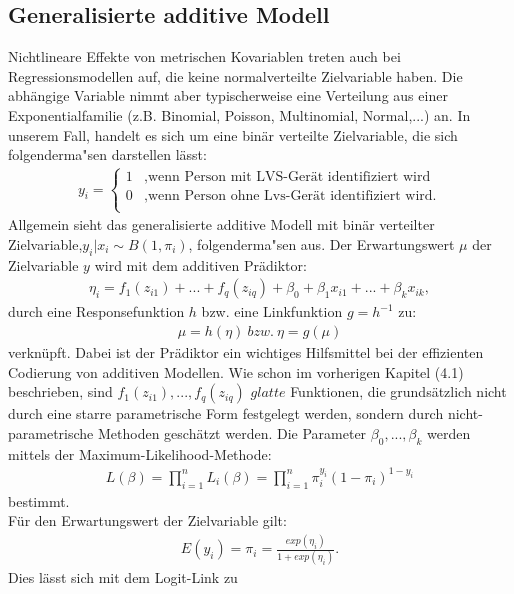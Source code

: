 \documentclass[12pt]{scrreprt}
\begin{document}
\subsection{Generalisierte additive Modell}
Nichtlineare Effekte von metrischen Kovariablen treten auch bei Regressionsmodellen auf, die keine normalverteilte Zielvariable haben. Die abhängige Variable nimmt aber typischerweise eine Verteilung aus einer Exponentialfamilie (z.B. Binomial, Poisson, Multinomial, Normal,...) an.  In unserem Fall, handelt es sich um eine binär verteilte Zielvariable, die sich folgenderma"sen darstellen lässt:
\begin{align}
y_{i}=\begin{cases}
1 & \text{,wenn Person mit LVS-Gerät identifiziert wird } \\
0 & \text{,wenn Person ohne Lvs-Gerät identifiziert wird.} \\
\end{cases}
\end{align}
Allgemein sieht das generalisierte additive Modell mit binär verteilter Zielvariable,\enspace $y_{i}|x_{i}\sim B(1,\pi_{i})$, folgenderma"sen aus.
Der Erwartungswert $\mu$ der Zielvariable $y$ wird mit dem additiven Prädiktor:
\begin{align}
\eta_{i}= f_{1}(z_{i1})+...+f_{q}(z_{iq})+\beta_{0}+\beta_{1}x_{i1}+...+\beta_{k}x_{ik},
\end{align}
durch eine Responsefunktion $h$ bzw. eine Linkfunktion $g=h^{-1}$ zu:
\begin{align}
\mu=h(\eta) ~bzw. ~\eta=g(\mu)
\end{align}
verknüpft.
Dabei ist der Prädiktor ein wichtiges Hilfsmittel bei der effizienten Codierung von additiven Modellen. Wie schon im vorherigen Kapitel (4.1) beschrieben, sind $f_{1}(z_{i1}),...,f_{q}(z_{iq})$ $glatte$ Funktionen, die grundsätzlich nicht durch eine starre parametrische Form festgelegt werden, sondern durch nicht-parametrische Methoden geschätzt werden. Die Parameter $\beta_{0},...,\beta_{k}$ werden mittels der Maximum-Likelihood-Methode:
\begin{align}
L(\beta)=\prod_{i=1}^{n}L_{i}(\beta)=\prod_{i=1}^{n}\pi_{i}^{y_{i}}(1-\pi_{i})^{1-y_{i}}
\end{align}
bestimmt. \\
Für den Erwartungswert der Zielvariable gilt:
\begin{align}
E(y_{i})=\pi_{i}=\frac{exp(\eta_{i})}{1+exp(\eta_{i})}.
\end{align}
Dies lässt sich mit dem Logit-Link zu
\end{document}
